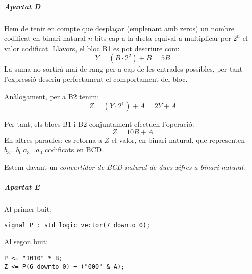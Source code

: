 \subparagraph{Apartat D}

Hem de tenir en compte que desplaçar (emplenant amb zeros) un nombre codificat
en binari natural $n$ bits cap a la dreta equival a multiplicar per $2^n$
el valor codificat. Llavors, el bloc \textsf{B1} es pot descriure com:
%
\begin{equation*}
  Y = \left(B \cdot 2^2\right) + B = 5B
\end{equation*}
%
La suma no sortirà mai de rang per a cap de les entrades possibles, per tant
l'expressió descriu perfectament el comportament del bloc.

Anàlogament, per a \textsf{B2} tenim:
%
\begin{equation*}
  Z = \left(Y \cdot 2^1\right) + A = 2Y + A
\end{equation*}

Per tant, els blocs \textsf{B1} i \textsf{B2} conjuntament efectuen l'operació:
%
\begin{equation*}
  Z = 10B + A
\end{equation*}
%
En altres paraules: es retorna a $Z$ el valor, en binari natural,
que representen $b_3...b_0\,a_3...a_0$ codificats en BCD.

Estem davant un \emph{convertidor de BCD natural de dues xifres a binari natural}.

\subparagraph{Apartat E}

Al primer buit:

\begin{verbatim}
signal P : std_logic_vector(7 downto 0);
\end{verbatim}

Al segon buit:

\begin{verbatim}
P <= "1010" * B;
Z <= P(6 downto 0) + ("000" & A);
\end{verbatim}

\finishpage


